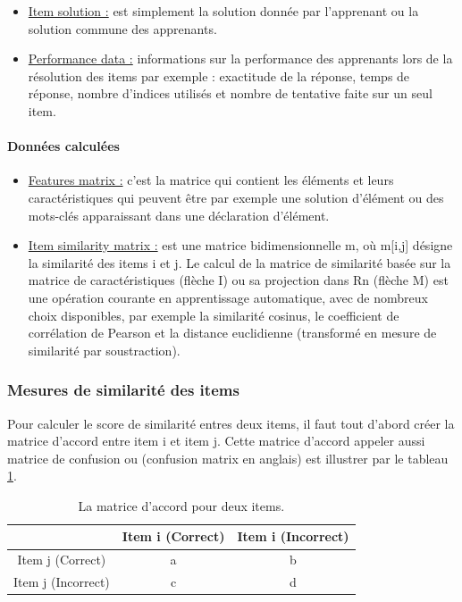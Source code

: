 \begin{itemize}
    \item \underline{Item solution :} est simplement la solution donnée par l’apprenant ou la solution commune des apprenants.
\end{itemize}

\begin{itemize}
    \item \underline{Performance data :} informations sur la performance des apprenants lors de la résolution des items par exemple : exactitude de la réponse, temps de réponse, nombre d'indices utilisés et nombre de tentative faite sur un seul item.
\end{itemize}

\paragraph{Données calculées \\}

\begin{itemize}
    \item \underline{Features matrix :} c'est la matrice qui contient les éléments et leurs caractéristiques qui peuvent être par exemple une solution d'élément ou des mots-clés apparaissant dans une déclaration d'élément.
	\item \underline{Item similarity matrix :} est une matrice bidimensionnelle m, où m[i,j] désigne la similarité des items i et j. Le calcul de la matrice de similarité basée sur la matrice de caractéristiques (flèche I) ou sa projection dans Rn (flèche M) est une opération courante en apprentissage automatique, avec de nombreux choix disponibles, par exemple la similarité cosinus, le coefficient de corrélation de Pearson et la distance euclidienne (transformé en mesure de similarité par soustraction).
\end{itemize}

\subsubsection{Mesures de similarité des items}
Pour calculer le score de similarité entres deux items, il faut tout d’abord créer la matrice d’accord entre item i et item j. Cette matrice d’accord appeler aussi matrice de confusion ou (confusion matrix en anglais) est illustrer par le tableau \ref{matrice_accord}.

\begin{table}[H]
    \centering
	\begin{tabular}{|c| c|c|}
	\hline
	 & Item i (Correct) & Item i (Incorrect)  \\ \hline
	 Item j (Correct) & a & b  \\  \hline
	 Item j (Incorrect) & c & d  \\  \hline
	\end{tabular}
	\caption{La matrice d’accord pour deux items.}
	\label{matrice_accord}
\end{table}

